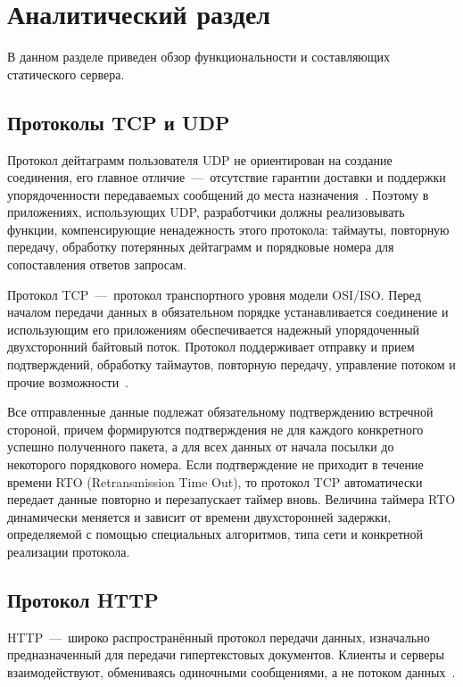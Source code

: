 \chapter{Аналитический раздел}

В данном разделе приведен обзор функциональности и составляющих статического сервера.

\section{Протоколы TCP и UDP}
Протокол дейтаграмм пользователя UDP не ориентирован на создание соединения, его главное отличие~---~отсутствие гарантии доставки и поддержки упорядоченности передаваемых сообщений до места назначения~\cite{tcp}. Поэтому в приложениях, использующих UDP, разработчики должны реализовывать функции, компенсирующие ненадежность этого протокола: таймауты, повторную передачу, обработку потерянных дейтаграмм и порядковые номера для сопоставления ответов запросам.

Протокол TCP~---~протокол транспортного уровня модели OSI/ISO. Перед началом передачи данных в обязательном порядке устанавливается соединение и использующим его приложениям обеспечивается надежный упорядоченный двухсторонний байтовый поток. Протокол поддерживает отправку и прием подтверждений, обработку таймаутов, повторную передачу, управление потоком и прочие возможности~\cite{tcp}.

Все отправленные данные подлежат обязательному подтверждению встречной стороной, причем формируются подтверждения не для каждого конкретного успешно полученного пакета, а для всех данных от начала посылки до некоторого порядкового номера. Если подтверждение не приходит в течение времени RTO (Retransmission Time Out), то протокол TCP автоматически передает данные повторно и перезапускает таймер вновь. Величина таймера RTO динамически меняется и зависит от времени двухсторонней задержки, определяемой с помощью специальных алгоритмов, типа сети и конкретной реализации протокола.

\section{Протокол HTTP}

HTTP~---~широко распространённый протокол передачи данных, изначально
предназначенный для передачи гипертекстовых документов. Клиенты и серверы взаимодействуют, обмениваясь одиночными сообщениями, а не потоком данных~\cite{http}. 

